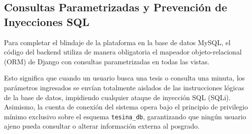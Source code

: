 \subsection{Consultas Parametrizadas y Prevención de Inyecciones SQL}
\label{subsec:seguridad_datos_arco}

Para completar el blindaje de la plataforma en la base de datos MySQL, el código del backend utiliza de manera obligatoria el mapeador objeto-relacional (ORM) de Django con consultas parametrizadas en todas las vistas. 

Esto significa que cuando un usuario busca una tesis o consulta una minuta, los parámetros ingresados se envían totalmente aislados de las instrucciones lógicas de la base de datos, impidiendo cualquier ataque de inyección SQL (SQLi). Asimismo, la cuenta de conexión del sistema opera bajo el principio de privilegio mínimo exclusivo sobre el esquema \texttt{tesina\_db}, garantizando que ningún usuario ajeno pueda consultar o alterar información externa al posgrado.
